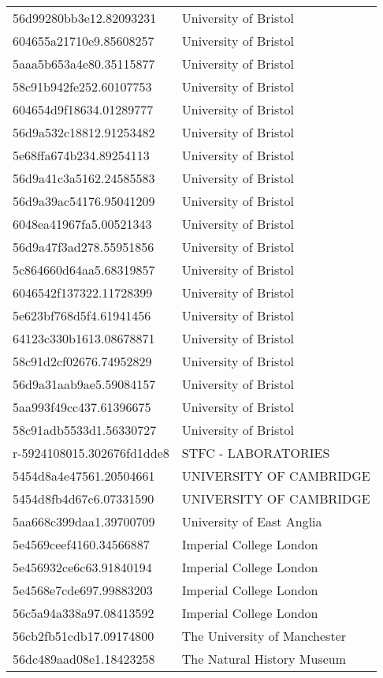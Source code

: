 \begin{tabular}{ll}
56d99280bb3e12.82093231 & University of Bristol \\
604655a21710e9.85608257 & University of Bristol \\
5aaa5b653a4e80.35115877 & University of Bristol \\
58c91b942fe252.60107753 & University of Bristol \\
604654d9f18634.01289777 & University of Bristol \\
56d9a532c18812.91253482 & University of Bristol \\
5e68ffa674b234.89254113 & University of Bristol \\
56d9a41c3a5162.24585583 & University of Bristol \\
56d9a39ac54176.95041209 & University of Bristol \\
6048ea41967fa5.00521343 & University of Bristol \\
56d9a47f3ad278.55951856 & University of Bristol \\
5c864660d64aa5.68319857 & University of Bristol \\
6046542f137322.11728399 & University of Bristol \\
5e623bf768d5f4.61941456 & University of Bristol \\
64123c330b1613.08678871 & University of Bristol \\
58c91d2cf02676.74952829 & University of Bristol \\
56d9a31aab9ae5.59084157 & University of Bristol \\
5aa993f49cc437.61396675 & University of Bristol \\
58c91adb5533d1.56330727 & University of Bristol \\
r-5924108015.302676fd1dde8 & STFC - LABORATORIES \\
5454d8a4e47561.20504661 & UNIVERSITY OF CAMBRIDGE \\
5454d8fb4d67c6.07331590 & UNIVERSITY OF CAMBRIDGE \\
5aa668c399daa1.39700709 & University of East Anglia \\
5e4569ceef4160.34566887 & Imperial College London \\
5e456932ce6c63.91840194 & Imperial College London \\
5e4568e7cde697.99883203 & Imperial College London \\
56c5a94a338a97.08413592 & Imperial College London \\
56cb2fb51cdb17.09174800 & The University of Manchester \\
56dc489aad08e1.18423258 & The Natural History Museum \\

\end{tabular}
